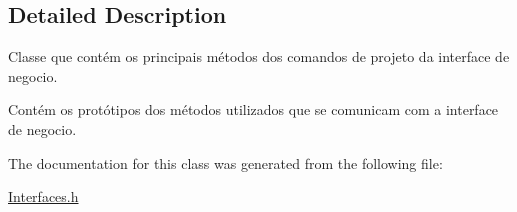 \subsection{Detailed Description}
Classe que contém os principais métodos dos comandos de projeto da interface de negocio. 

Contém os protótipos dos métodos utilizados que se comunicam com a interface de negocio. 

The documentation for this class was generated from the following file\+:\begin{DoxyCompactItemize}
\item 
\hyperlink{_interfaces_8h}{Interfaces.\+h}\end{DoxyCompactItemize}
